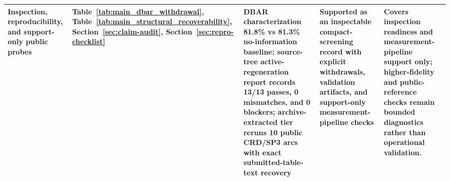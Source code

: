 \begin{table}[t]
{\begin{tabular}{p{2.5cm} p{4.3cm} p{3.4cm} p{2.3cm} p{3.0cm}}
\addlinespace
Inspection, reproducibility, and support-only public probes & Table~\ref{tab:main_dbar_withdrawal}, Table~\ref{tab:main_structural_recoverability}, Section~\ref{sec:claim-audit}, Section~\ref{sec:repro-checklist} & DBAR characterization 81.8\% vs 81.3\% no-information baseline; source-tree active-regeneration report records 13/13 passes, 0 mismatches, and 0 blockers; archive-extracted tier reruns 10 public CRD/SP3 arcs with exact submitted-table-text recovery & Supported as an inspectable compact-screening record with explicit withdrawals, validation artifacts, and support-only measurement-pipeline checks & Covers inspection readiness and measurement-pipeline support only; higher-fidelity and public-reference checks remain bounded diagnostics rather than operational validation.\\
\bottomrule
\end{tabular}%
}
\end{table}
